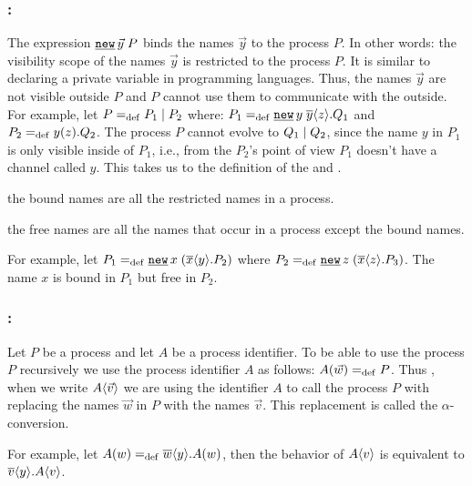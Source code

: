 \subsubsection{:}

The expression $\procres{\vec{y}}{P}$ binds the names $\vec{y}$ to the process $P$. In other words: the visibility scope of the  names $\vec{y}$ is restricted to the process $P$. It is similar to declaring a private variable in programming languages. Thus, the names $\vec{y}$ are not visible outside $P$ and $P$ cannot use them to communicate with the outside. For example, let $P=_{\mathrm{def}}P_1 \mid P_2$ where: $P_1\define\procres{y}{\out{y}{z}.Q_1}$ and $P_2=_{\mathrm{def}}y(z).Q_2$. The process $P$ cannot evolve to $Q_1 \mid Q_2$, since the name $y$ in $P_1$ is only visible inside of $P_1$, i.e., from the $P_2$'s point of view $P_1$ doesn't have a channel called $y$. This takes us to the definition of the 
 and .

\begin{definition}
\label{def_bound_names}
 the bound names are all the restricted names in a process.
\end{definition}
\begin{definition}
\label{def_free_names}
 the free names are all the names that occur in a process except the bound names.
\end{definition}

For example, let $P_1\define\procres{x}{(\out{x}{y}.P_2)}$ where $P_2\define\procres{z}{(\out{x}{z}.P_3)}$. The name $x$ is bound in $P_1$ but free in $P_2$.


\subsubsection{:}
\label{subsubsection_process_call}

Let $P$ be a process and let $A$ be a process identifier. To be able to use the process $P$ recursively we use the process identifier $A$ as follows: $A(\vec{w})=_{\mathrm{def}}{}P$. Thus , when we write $A\langle\vec{v}\rangle$ we are using the identifier $A$ to call the process $P$ with replacing the names $\vec{w}$ in $P$ with the names $\vec{v}$. This replacement is called the $\alpha$-conversion.

For example, let $A(w)=_{\mathrm{def}}\overline{w}\langle y\rangle.A(w)$, then the behavior of $A\langle v\rangle$ is equivalent to $\overline{v}\langle y\rangle.A\langle v\rangle$. 

